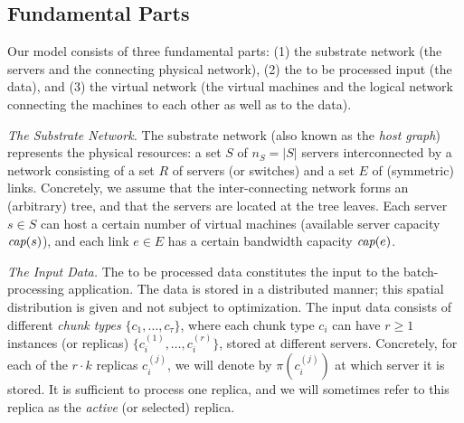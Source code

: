 \documentclass[9pt,twocolumn]{scrartcl}
\newcommand{\ChunkType}{\tau}
\newcommand{\achunk}{\ensuremath{c}}
\newcommand{\capacity}{\emph{cap}}
\begin{document}

\subsection{Fundamental Parts}

Our model consists of three fundamental parts: (1) the substrate network (the servers
and the connecting physical network),
(2) the to be processed input (the data), and
(3) the virtual network (the virtual machines and the logical network connecting the machines to each other
as well as to the data).

\emph{The Substrate Network.} The substrate network (also known as the \emph{host graph}) represents the physical resources:
a set $S$ of $n_S=|S|$ servers interconnected by a network consisting of a set $R$ of servers (or switches)
and a set $E$ of (symmetric) links. Concretely, we assume that the inter-connecting network forms an (arbitrary) tree,
and that the servers are located at the tree leaves.
Each server $s\in S$ can host a certain number
of virtual machines (available server capacity $\capacity(s)$), and each link $e\in E$ has a certain bandwidth
capacity $\capacity(e)$.

\emph{The Input Data.} The to be processed data constitutes the input to the batch-processing application.
The data is stored in a distributed manner; this spatial distribution is given and not subject to optimization.
The input data consists of different \emph{chunk types} $\{\achunk_1, \ldots, \achunk_{\ChunkType}\}$,
where each chunk type $\achunk_i$ can have $r\geq 1$ instances (or replicas) $\{\achunk_{i}^{(1)},\ldots, \achunk_{i}^{(r)}\}$, 
 stored at different servers.
Concretely, for each of the $r\cdot k$ replicas $\achunk_{i}^{(j)}$, we will denote by $\pi(\achunk_{i}^{(j)})$ at
which server it is stored. It is sufficient to process one replica, and we will sometimes refer to this
replica as the \emph{active} (or selected) replica.
\end{document}
